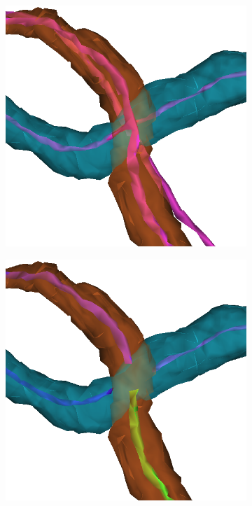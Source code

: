 \begin{figure}[htpb]
\begin{subfigure}[b]{0.24\textwidth}
		\includegraphics[width=\textwidth]{data/images/splitNMatch/skelNSeg.png}
		\caption{\label{fig:splitNMatchB}}
	\end{subfigure}
	\hfill
	\begin{subfigure}[b]{0.24\textwidth}
		\centering
		\includegraphics[width=\textwidth]{data/images/splitNMatch/split.png}

\end{subfigure}
\end{figure}
